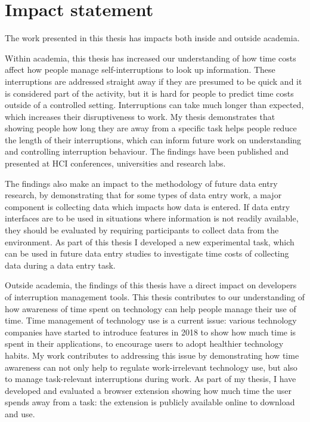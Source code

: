 \section*{Impact statement}

The work presented in this thesis has impacts both inside and outside academia. 

Within academia, this thesis has increased our understanding of how time costs affect how people manage self-interruptions to look up information. These interruptions are addressed straight away if they are presumed to be quick and it is considered part of the activity, but it is hard for people to predict time costs outside of a controlled setting. Interruptions can take much longer than expected, which increases their disruptiveness to work. My thesis demonstrates that showing people how long they are away from a specific task helps people reduce the length of their interruptions, which can inform future work on understanding and controlling interruption behaviour. The findings have been published and presented at HCI conferences, universities and research labs. 

The findings also make an impact to the methodology of future data entry research, by demonstrating that for some types of data entry work, a major component is collecting data which impacts how data is entered. If data entry interfaces are to be used in situations where information is not readily available, they should be evaluated  by requiring participants to collect data from the environment. As part of this thesis I developed a new experimental task, which can be used in future data entry studies to investigate time costs of collecting data during a data entry task.

Outside academia, the findings of this thesis have a direct impact on developers of interruption management tools. This thesis contributes to our understanding of how awareness of time spent on technology can help people manage their use of time. Time management of technology use is a current issue: various technology companies have started to introduce features in 2018 to show how much time is spent in their applications, to encourage users to adopt healthier technology habits. My work contributes to addressing this issue by demonstrating how time awareness can not only help to regulate work-irrelevant technology use, but also to manage task-relevant interruptions during work. As part of my thesis, I have developed and evaluated a browser extension showing how much time the user spends away from a task: the extension is publicly available online to download and use. 

\clearpage\mbox{}\thispagestyle{empty}\clearpage
